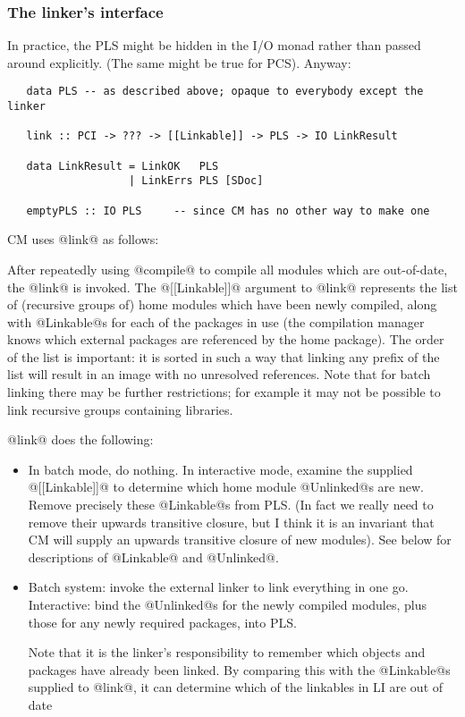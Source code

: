 \documentclass[11pt]{article}
\begin{document}
\subsubsection{The linker's interface}

In practice, the PLS might be hidden in the I/O monad rather
than passed around explicitly.  (The same might be true for PCS).
Anyway:

\begin{verbatim}
   data PLS -- as described above; opaque to everybody except the linker

   link :: PCI -> ??? -> [[Linkable]] -> PLS -> IO LinkResult

   data LinkResult = LinkOK   PLS
                   | LinkErrs PLS [SDoc]

   emptyPLS :: IO PLS     -- since CM has no other way to make one
\end{verbatim}

CM uses @link@ as follows:

After repeatedly using @compile@ to compile all modules which are
out-of-date, the @link@ is invoked.  The @[[Linkable]]@ argument to
@link@ represents the list of (recursive groups of) home modules which
have been newly compiled, along with @Linkable@s for each of
the packages in use (the compilation manager knows which external
packages are referenced by the home package).  The order of the list
is important: it is sorted in such a way that linking any prefix of
the list will result in an image with no unresolved references.  Note
that for batch linking there may be further restrictions; for example
it may not be possible to link recursive groups containing libraries.

@link@ does the following:

\begin{itemize}
  \item 
  In batch mode, do nothing.  In interactive mode,
  examine the supplied @[[Linkable]]@ to determine which home 
  module @Unlinked@s are new.  Remove precisely these @Linkable@s 
  from PLS.  (In fact we really need to remove their upwards
  transitive closure, but I think it is an invariant that CM will
  supply an upwards transitive closure of new modules).
  See below for descriptions of @Linkable@ and @Unlinked@.

  \item 
  Batch system: invoke the external linker to link everything in one go.
  Interactive: bind the @Unlinked@s for the newly compiled modules,
  plus those for any newly required packages, into PLS.

  Note that it is the linker's responsibility to remember which
  objects and packages have already been linked.  By comparing this
  with the @Linkable@s supplied to @link@, it can determine which
  of the linkables in LI are out of date
\end{itemize}
\end{document}
